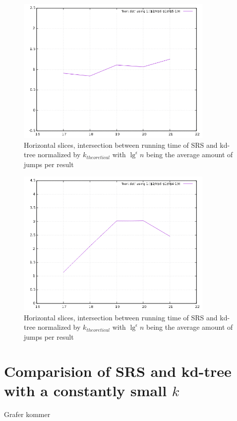 \begin{figure}[h]
    \centering
    \includegraphics[width = 0.85\textwidth]{pictures/analysis/hori_theory.png}
    \caption{Horizontal slices, intersection between running time of SRS and kd-tree normalized by $k_{theoretical}$ with $\lg^\epsilon n$ being the average amount of jumps per result}\label{fig:vert_theory}
\end{figure}


\begin{figure}[h]
    \centering
    \includegraphics[width = 0.85\textwidth]{pictures/analysis/hori_theory_worst_jump.png}
    \caption{Horizontal slices, intersection between running time of SRS and kd-tree normalized by $k_{theoretical}$ with $\lg^\epsilon n$ being the average amount of jumps per result}\label{fig:vert_theory}
\end{figure}

\section{Comparision of SRS and kd-tree with a constantly small $k$}

Grafer kommer

